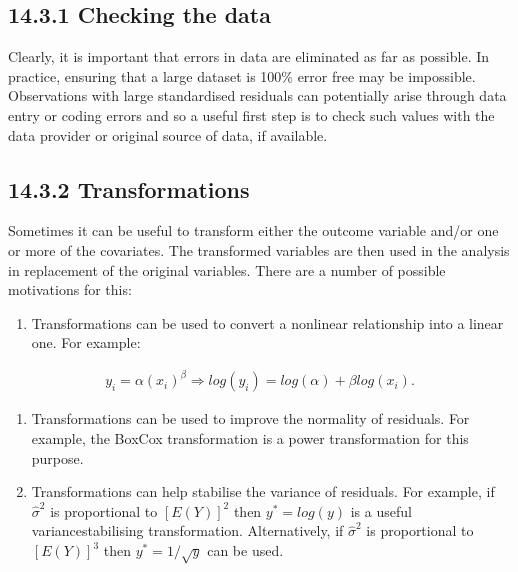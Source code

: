 \documentclass[letterpaper,10pt,english]{jupyterBook}
\begin{document}
\subsection{14.3.1 Checking the data}
\label{\detokenize{14.e. Linear Regression III:checking-the-data}}
\sphinxAtStartPar
Clearly, it is important that errors in data are eliminated as far as possible. In practice, ensuring that a large dataset is 100\% error free may be impossible. Observations with large standardised residuals can potentially arise through data entry or coding errors and so a useful first step is to check such values with the data provider or original source of data, if available.


\subsection{14.3.2 Transformations}
\label{\detokenize{14.e. Linear Regression III:transformations}}
\sphinxAtStartPar
Sometimes it can be useful to transform either the outcome variable and/or one or more of the covariates. The transformed variables are then used in the analysis in replacement of the original variables. There are a number of possible motivations for this:
\begin{enumerate}
%
\item {} 
\sphinxAtStartPar
Transformations can be used to convert a non\sphinxhyphen{}linear relationship into a linear one. For example:

\end{enumerate}
\begin{equation*}
\begin{split}
y_i = \alpha(x_i)^{\beta} ⇒log(y_i) = log (\alpha)+\beta log (x_i).
\end{split}
\end{equation*}\begin{enumerate}
%
\item {} 
\sphinxAtStartPar
Transformations can be used to improve the normality of residuals. For example, the Box\sphinxhyphen{}Cox transformation is a power transformation for this purpose.

\item {} 
\sphinxAtStartPar
Transformations can help stabilise the variance of residuals. For example, if \(\hat{\sigma}^2\) is proportional to \([E(Y)]^2\) then \(y^*=log(y)\) is a useful variance\sphinxhyphen{}stabilising transformation. Alternatively, if \(\hat{\sigma}^2\) is proportional to \([E(Y)]^3\) then \(y^*=1/\sqrt{y}\) can be used.

\end{enumerate}
\end{document}
